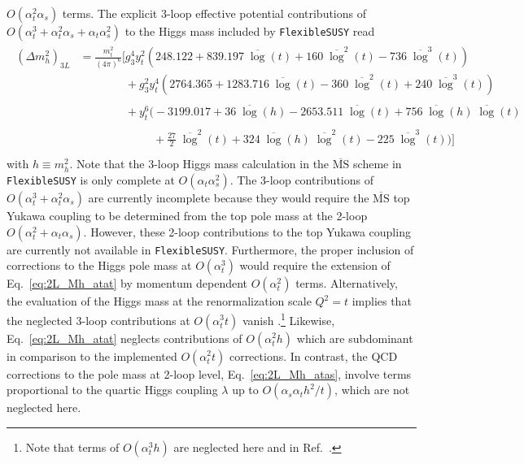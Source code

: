 \documentclass[final,3p,11pt,pdflatex]{elsarticle}
\makeatletter
\newcommand{\fs}{\texttt{FlexibleSUSY}\@\xspace}
\newcommand{\ol}[1]{\overline{#1}}
\newcommand{\MSbar}{\ensuremath{\ol{\text{MS}}}\xspace}
\newcommand{\barlog}{\overline{\log}}
\def\at{\alpha_t}
\def\as{\alpha_s}
\makeatother
\begin{document}
$O(\at^2\as)$ terms.
%
The explicit 3-loop effective potential contributions of
$O(\at^3 + \at^2 \as + \at \as^2)$ to the
Higgs mass included by \fs read
%
\begin{align}
\begin{split}
  (\Delta m_h^2)_{3L} &=
  \frac{m_t^2}{(4\pi)^6} \Bigg[
     g_3^4 y_t^2 \left(248.122 + 839.197 \;\barlog(t) + 160 \;\barlog^2(t) - 736 \;\barlog^3(t)\right) \\
     &\phantom{=\frac{m_t^2}{(4\pi)^6} \Bigg[}
     + g_3^2 y_t^4 \left(2764.365 + 1283.716 \;\barlog(t) - 360 \;\barlog^2(t) + 240 \;\barlog^3(t)\right) \\
     &\phantom{=\frac{m_t^2}{(4\pi)^6} \Bigg[}
     + y_t^6 \Big(-3199.017 + 36 \;\barlog(h) - 2653.511 \;\barlog(t) + 756 \;\barlog(h) \;\barlog(t)\\
     &\phantom{=\frac{m_t^2}{(4\pi)^6} \Bigg[}\qquad~~
     + \frac{27}{2} \;\barlog^2(t) + 324 \;\barlog(h) \;\barlog^2(t) - 225 \;\barlog^3(t)\Big)
  \Bigg]
\end{split}
\end{align}
%
with $h\equiv m_h^2$.  Note that the 3-loop Higgs mass calculation in
the \MSbar scheme in \fs is only complete at $O(\at\as^2)$.  The
3-loop contributions of $O(\at^3 + \at^2 \as)$ are currently incomplete
because they would require the \MSbar top Yukawa coupling to be determined
from the top pole mass at the 2-loop $O(\at^2 + \at\as)$.
However, these 2-loop contributions to the top Yukawa coupling are
currently not available in \fs. Furthermore, the proper inclusion of
corrections to the Higgs pole mass at $O(\at^3)$
would require the extension of Eq.~\eqref{eq:2L_Mh_atat} by momentum
dependent $O(\at^2)$ terms. Alternatively, the evaluation of the Higgs mass at
the renormalization scale $Q^2 = t$ implies that the neglected
3-loop contributions at $O(\at^3 t)$ vanish
\cite{Martin:2014cxa}.\footnote{Note that terms of $O(\at^3 h)$ are
  neglected here and in Ref.\ \cite{Martin:2014cxa}.}
Likewise, Eq.~\eqref{eq:2L_Mh_atat} neglects contributions of $O(\at^2h)$ which are
subdominant in comparison to the implemented $O(\at^2t)$ corrections.
In contrast, the QCD corrections to the pole mass at 2-loop level, Eq.~\eqref{eq:2L_Mh_atas}, involve
terms proportional to the quartic Higgs coupling $\lambda$ up to $O(\as\at h^2/t)$, which are not
neglected here.
\end{document}
